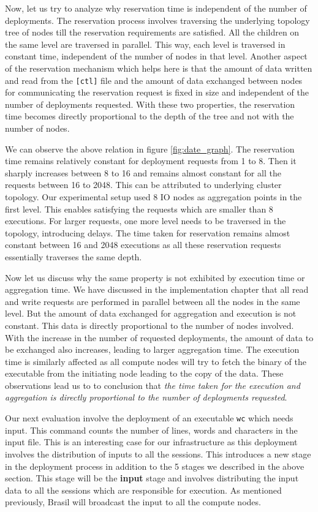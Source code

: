 Now, let us try to analyze why reservation time is independent of the number of
deployments.  The reservation process involves traversing the underlying
topology tree of nodes till the reservation requirements are satisfied.  All the
children on the same level are traversed in parallel.  This way,
each level is traversed in constant time, independent of the number of nodes in
that level.  Another aspect of the reservation mechanism which helps here is
that the amount of data written and read from the \texttt{[ctl]} file and the
amount of data exchanged between nodes for communicating the reservation request is
fixed in size and independent of the number of deployments requested.  With
these two properties, the reservation time becomes directly proportional to the
depth of the tree and not with the number of nodes.

We can observe the above relation in figure \ref{fig:date_graph}. The 
reservation time remains relatively constant for deployment requests from 1 to
8.  Then it sharply increases between 8 to 16 and remains almost constant for
all the requests between 16 to 2048.  This can be attributed to underlying
cluster topology. 
Our experimental setup used 8 IO nodes as aggregation points in the first level. 
This enables satisfying the requests which are smaller
than 8 executions. For larger requests, one more level needs to be traversed
in the topology, introducing delays.  The time taken for reservation remains
almost constant between 16 and 2048 executions as all these reservation
requests essentially traverses the same depth.  

Now let us discuss why the same property is not exhibited by execution time or
aggregation time. We have discussed in the implementation chapter that all
read and write requests are performed in parallel between all the nodes in the
same level.  But the amount of data exchanged for aggregation and execution is
not constant.  This data is directly proportional to the number of nodes
involved.  With the increase in the number of requested deployments, the
amount of data to be exchanged also increases, leading to larger aggregation
time. The execution time is similarly affected as all compute nodes will
try to fetch the binary of the executable from the initiating node leading to
the copy of the data. These observations lead us to to conclusion that
\textit{the time taken for the execution and aggregation is directly
proportional to the number of deployments requested}.

Our next evaluation involve the deployment of an executable \texttt{wc} which
needs input. This command counts the number of lines, words and characters in
the input file.  This is an interesting case for our infrastructure as this
deployment involves the distribution of inputs to all the sessions.  This
introduces a new stage in the deployment process in addition to the 5 stages we
described in the above section.  This stage will be the \textbf{input} stage and
involves distributing the input data to all the sessions which are responsible
for execution.  As mentioned previously,
Brasil will broadcast the input to all the compute
nodes.

